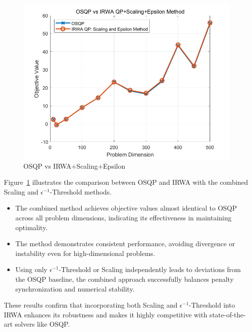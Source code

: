 \documentclass{article}
\begin{document}
\begin{figure}[H]
    \centering
    \includegraphics[width=0.75\linewidth]{fig/OSQP_vs_Scaling+Epsilon.png}
    \caption{OSQP vs IRWA+Scaling+Epsilon}
    \label{fig:OSQP vs IRWA+Scaling+Epsilon}
\end{figure}
Figure~\ref{fig:OSQP vs IRWA+Scaling+Epsilon} illustrates the comparison between OSQP and IRWA with the combined Scaling and \(\epsilon^{-1}\)-Threshold methods. 

\begin{itemize}
    \item The combined method achieves objective values almost identical to OSQP across all problem dimensions, indicating its effectiveness in maintaining optimality.

    \item The method demonstrates consistent performance, avoiding divergence or instability even for high-dimensional problems.

    \item  Using only \(\epsilon^{-1}\)-Threshold or Scaling independently leads to deviations from the OSQP baseline, the combined approach successfully balances penalty synchronization and numerical stability.
\end{itemize}

These results confirm that incorporating both Scaling and \(\epsilon^{-1}\)-Threshold into IRWA enhances its robustness and makes it highly competitive with state-of-the-art solvers like OSQP.
\end{document}
